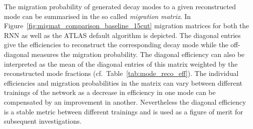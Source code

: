 The migration probability of generated decay modes to a given reconstructed mode
can be summarised in the so called \emph{migration matrix}. In
Figure~\ref{fig:migmat_comparison_baseline_15cut} migration matrices for both
the RNN as well as the ATLAS default algorithm is depicted. The diagonal entries
give the efficiencies to reconstruct the corresponding decay mode while the
off-diagonal measures the migration probability. The diagonal efficiency can
also be interpreted as the mean of the diagonal entries of this matrix weighted
by the reconstructed mode fractions (cf.\ Table~\ref{tab:mode_reco_eff}). The
individual efficiencies and migration probabilities in the matrix can vary
between different trainings of the network as a decrease in efficiency in one
mode can be compensated by an improvement in another. Nevertheless the diagonal
efficiency is a stable metric between different trainings and is used as a
figure of merit for subsequent investigations.

